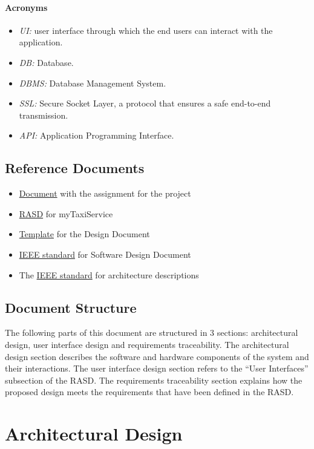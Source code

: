 \documentclass{article}
\begin{document}
	\paragraph{Acronyms}
	\begin{itemize}
		\item \textit{UI:} user interface through which the end users can interact with the application.
		\item \textit{DB:} Database.
		\item \textit{DBMS:} Database Management System.
		\item \textit{SSL:} Secure Socket Layer, a protocol that ensures a safe end-to-end transmission.
		\item \textit{API:} Application Programming Interface.
	\end{itemize}
	\subsection{Reference Documents}
	\begin{itemize}
		\item \href{run:./external_references/assignments.pdf}{Document} with the assignment for the project
		\item \href{run:./external_references/Rasd.pdf}{RASD} for myTaxiService
		\item \href{run:./external_references/DDTOC.pdf}{Template} for the Design Document
		\item \href{run:./external_references/IEEESoftwareDesignDescriptions.pdf}{IEEE standard} for Software Design Document
		\item The \href{run:./external_references/IEEEArchitectureDescription.pdf}{IEEE standard} for architecture descriptions
	\end{itemize}
	\subsection{Document Structure}
	The following parts of this document are structured in 3 sections: architectural design, user interface design and requirements traceability. The architectural design section describes the software and hardware components of the system and their interactions. The user interface design section refers to the ``User Interfaces'' subsection of the RASD\@. The requirements traceability section explains how the proposed design meets the requirements that have been defined in the RASD\@.
	\clearpage
	\section{Architectural Design}
\end{document}
